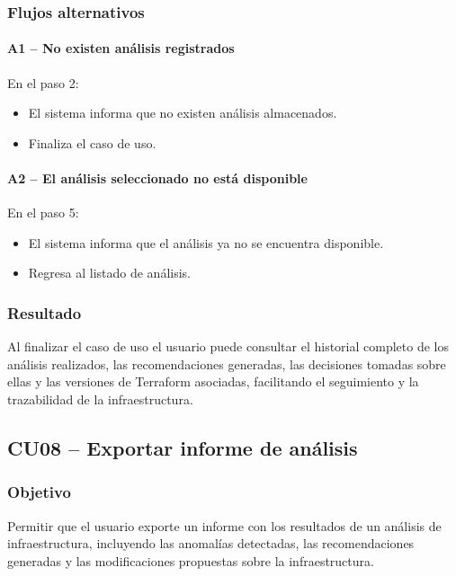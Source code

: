 \subsubsection*{Flujos alternativos}

\paragraph{A1 -- No existen análisis registrados}

En el paso 2:

\begin{itemize}
\item El sistema informa que no existen análisis almacenados.
\item Finaliza el caso de uso.
\end{itemize}

\paragraph{A2 -- El análisis seleccionado no está disponible}

En el paso 5:

\begin{itemize}
\item El sistema informa que el análisis ya no se encuentra disponible.
\item Regresa al listado de análisis.
\end{itemize}

\subsubsection*{Resultado}

Al finalizar el caso de uso el usuario puede consultar el historial completo de los análisis realizados, las recomendaciones generadas, las decisiones tomadas sobre ellas y las versiones de Terraform asociadas, facilitando el seguimiento y la trazabilidad de la infraestructura.

\subsection{CU08 -- Exportar informe de análisis}

\subsubsection*{Objetivo}

Permitir que el usuario exporte un informe con los resultados de un análisis de infraestructura, incluyendo las anomalías detectadas, las recomendaciones generadas y las modificaciones propuestas sobre la infraestructura.

